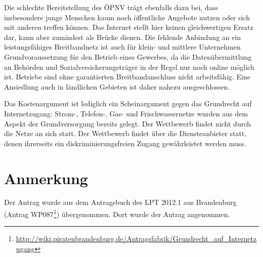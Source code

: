 Die schlechte Bereitstellung des ÖPNV trägt ebenfalls dazu bei, dass insbesondere junge Menschen kaum noch öffentliche Angebote nutzen oder sich mit anderen treffen können. Das Internet stellt hier keinen gleichwertigen Ersatz dar, kann aber zumindest als Brücke dienen. Die fehlende Anbindung an ein leistungsfähiges Breitbandnetz ist auch für klein- und mittlere Unternehmen Grundvoraussetzung für den Betrieb eines Gewerbes, da die Datenübermittlung an Behörden und Sozialversicherungsträger in der Regel nur noch online möglich ist. Betriebe sind ohne garantierten Breitbandanschluss nicht arbeitsfähig. Eine Ansiedlung auch in ländlichen Gebieten ist daher nahezu ausgeschlossen.

Das Kostenargument ist lediglich ein Scheinargument gegen das Grundrecht auf Internetzugang: Strom-, Telefon-, Gas- und Frischwassernetze wurden aus dem Aspekt der Grundversorgung bereits gelegt. Der Wettbewerb findet nicht durch die Netze an sich statt. Der Wettbewerb findet über die Diensteanbieter statt, denen ihrerseits ein diskriminierungsfreien Zugang gewährleistet werden muss.

\section{Anmerkung}

Der Antrag wurde aus dem Antragsbuch des LPT 2012.1 aus Brandenburg (Antrag WP087\footnote{\url{http://wiki.piratenbrandenburg.de/Antragsfabrik/Grundrecht\_auf\_Internetzugang}}) übergenommen. Dort wurde der Antrag angenommen.

